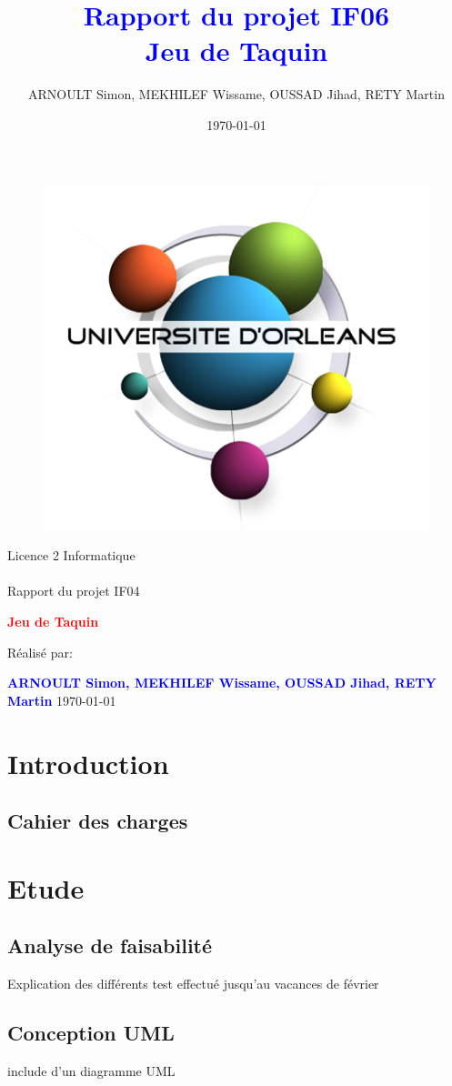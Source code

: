 \documentclass[a4paper,twoside,12pt]{report}
\title{\textcolor{blue}{\Large Rapport du projet IF06}\\\textcolor{blue}{\Large Jeu de Taquin}}
\author{ARNOULT Simon, MEKHILEF Wissame, OUSSAD Jihad, RETY Martin \date{\today}}
\begin{document}
\thispagestyle{empty}
%
\begin{figure}[H]
\includegraphics[width=0.2\linewidth]{Logo-univ-orleans.png}

\end{figure}
\vspace{2cm}
%
\begin{center}
{\Huge Licence 2 Informatique\\\ \\Rapport du projet IF04}
\par\vspace{1.4cm}

{\Huge\bf \textcolor{red}{\bf Jeu de Taquin}}
\par\vspace{1.6cm}

{\Large       Réalisé par:}
\par\vspace{1.3cm}
{\large\bf \textcolor{blue}{ARNOULT Simon, MEKHILEF Wissame, OUSSAD Jihad, RETY Martin}}
\vfill
\today
\end{center}
\newpage
\pagestyle{fancy}

\begin{abstract}
%
\end{abstract}
 
\newpage
\tableofcontents
\listoffigures
\newpage

\chapter{Introduction}
% 
\section{Cahier des charges }
%
\chapter{Etude}
%
\section{Analyse de faisabilité}
Explication des différents test effectué jusqu'au vacances de février 
\section{Conception UML}
include d'un diagramme UML 
\end{document}
